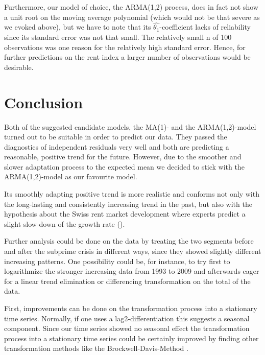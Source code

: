 \documentclass[11pt,a4paper]{article}
\begin{document}
Furthermore, our model of choice, the ARMA(1,2) process, does in fact not show a unit root on the moving average polynomial (which would not be that severe as we evoked above), but we have to note that its $\hat{\theta_1}$-coefficient lacks of reliability since its standard error was not that small.
The relatively small n of 100 observations was one reason for the relatively high standard error.
Hence, for further predictions on the rent index a larger number of observations would be desirable.



\section{Conclusion}

Both of the suggested candidate models, the MA(1)- and the ARMA(1,2)-model turned out to be suitable in order to predict our data.
They passed the diagnostics of independent residuals very well and both are predicting a reasonable, positive trend for the future.
However, due to the smoother and slower adaptation process to the expected mean we decided to stick with the ARMA(1,2)-model as our favourite model.

Its smoothly adapting positive trend is more realistic and conforms not only with the long-lasting and consistently increasing trend in the past, but also with the hypothesis about the Swiss rent market development where experts predict a slight slow-down of the growth rate (\cite[p.~4]{cs}).

Further analysis could be done on the data by treating the two segments before and after the subprime crisis in different ways, since they showed slightly different increasing patterns.
One possibility could be, for instance, to try first to logarithmize the stronger increasing data from 1993 to 2009 and afterwards eager for a linear trend elimination or differencing transformation on the total of the data.

First, improvements can be done on the transformation process into a stationary time series.
Normally, if one uses a lag2-differentiation this suggests a seasonal component.
Since our time series showed no seasonal effect the transformation process into a stationary time series could be certainly improved by finding other transformation methods like the Brockwell-Davis-Method \citep{bd02}.
\end{document}
